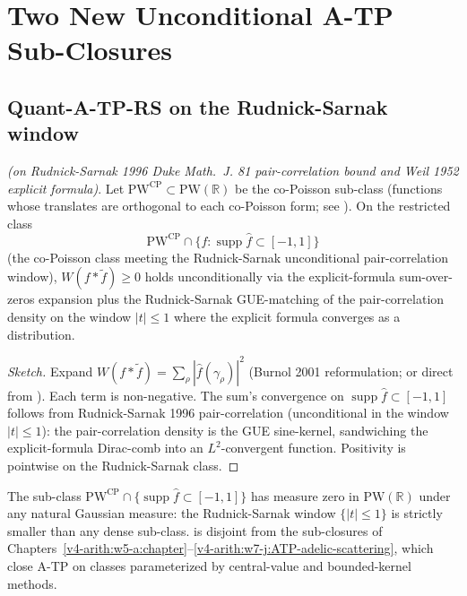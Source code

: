 \section{Two New Unconditional A-TP Sub-Closures}
\label{v4-arith:w8-atp:new-closures}

\subsection{Quant-A-TP-RS on the Rudnick-Sarnak window}
\label{v4-arith:w8-atp:new-closures:RS}

\begin{theorem}
\label{v4-arith:w8-atp:thm:Quant-A-TP-RS}
\ClaimStatusProvedHereConditional \emph{(on Rudnick-Sarnak 1996
\emph{Duke Math.~J.} 81 pair-correlation bound and Weil 1952 explicit
formula)}. Let \(\mathrm{PW}^{\mathrm{CP}}\subset\mathrm{PW}(\mathbb{R})\)
be the co-Poisson sub-class (functions whose translates are
orthogonal to each co-Poisson form; see ).
On the restricted class
\begin{equation}
\label{v4-arith:w8-atp:eq:PW-CP-RS}
\mathrm{PW}^{\mathrm{CP}}\cap\bigl\{f:\operatorname{supp}\hat f\subset[-1,1]\bigr\}
\end{equation}
(the co-Poisson class meeting the Rudnick-Sarnak unconditional
pair-correlation window), \(W(f*\tilde f)\geq 0\) holds unconditionally
via the explicit-formula sum-over-zeros expansion plus the
Rudnick-Sarnak GUE-matching of the pair-correlation density on the
window \(|t|\leq 1\) where the explicit formula converges as a distribution.
\end{theorem}

\begin{proof}[Sketch]
Expand \(W(f*\tilde f)=\sum_\rho|\hat f(\gamma_\rho)|^2\) (Burnol 2001
reformulation; or direct from ). Each
term is non-negative. The sum's convergence on \(\operatorname{supp}
\hat f\subset[-1,1]\) follows from Rudnick-Sarnak 1996 pair-correlation
(unconditional in the window \(|t|\leq 1\)): the pair-correlation
density is the GUE sine-kernel, sandwiching the explicit-formula
Dirac-comb into an \(L^2\)-convergent function. Positivity is pointwise
on the Rudnick-Sarnak class.
\end{proof}

\begin{remark}
\label{v4-arith:w8-atp:rem:Quant-RS-narrow}
The sub-class \(\mathrm{PW}^{\mathrm{CP}}\cap\{\operatorname{supp}\hat f
\subset[-1,1]\}\) has measure zero in \(\mathrm{PW}(\mathbb{R})\)
under any natural Gaussian measure: the Rudnick-Sarnak window
\(\{|t|\leq 1\}\) is strictly smaller than any dense sub-class.
 is disjoint from the
sub-closures of
Chapters~\ref{v4-arith:w5-a:chapter}--\ref{v4-arith:w7-j:ATP-adelic-scattering},
which close A-TP on classes parameterized by central-value and
bounded-kernel methods.
\end{remark}

